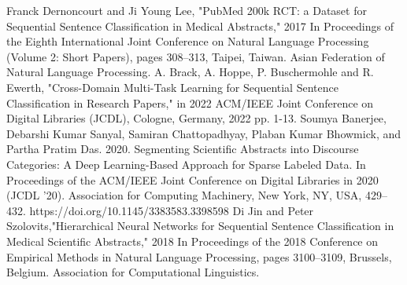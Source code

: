 \documentclass[conference]{IEEEtran}
\begin{document}
\begin{thebibliography}{00}
 Franck Dernoncourt and Ji Young Lee, "PubMed 200k RCT: a Dataset for Sequential Sentence Classification in Medical Abstracts," 2017 In Proceedings of the Eighth International Joint Conference on Natural Language Processing (Volume 2: Short Papers), pages 308–313, Taipei, Taiwan. Asian Federation of Natural Language Processing.
 A. Brack, A. Hoppe, P. Buschermohle and R. Ewerth, "Cross-Domain Multi-Task Learning for Sequential Sentence Classification in Research Papers," in 2022 ACM/IEEE Joint Conference on Digital Libraries (JCDL), Cologne, Germany, 2022 pp. 1-13.
 Soumya Banerjee, Debarshi Kumar Sanyal, Samiran Chattopadhyay, Plaban Kumar Bhowmick, and Partha Pratim Das. 2020. Segmenting Scientific Abstracts into Discourse Categories: A Deep Learning-Based Approach for Sparse Labeled Data. In Proceedings of the ACM/IEEE Joint Conference on Digital Libraries in 2020 (JCDL '20). Association for Computing Machinery, New York, NY, USA, 429–432. https://doi.org/10.1145/3383583.3398598
 Di Jin and Peter Szolovits,"Hierarchical Neural Networks for Sequential Sentence Classification in Medical Scientific Abstracts," 2018 In Proceedings of the 2018 Conference on Empirical Methods in Natural Language Processing, pages 3100–3109, Brussels, Belgium. Association for Computational Linguistics.


\end{thebibliography}
\end{document}
